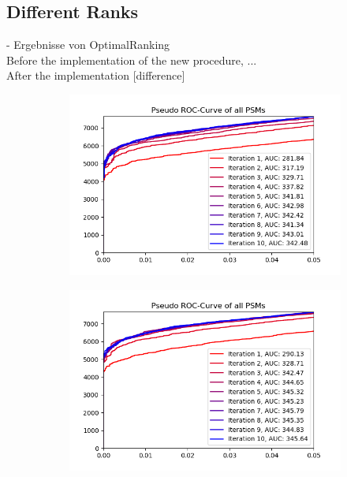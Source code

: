 \subsection{Different Ranks}
- Ergebnisse von OptimalRanking\\
Before the implementation of the new procedure, ...\\
After the implementation [difference]
\renewcommand{\baselinestretch}{0.9}
\begin{figure}
	\normalsize
	\centering
	\begin{subfigure}{0.45\textwidth}
	\includegraphics[width = \textwidth]{figures/allRanks.png}
	\caption[Result of dropping lower ranks at the end]{}
	\label{fig:all_ranks}
	\end{subfigure}
	\hfill
	\begin{subfigure}{0.45\textwidth}
	\includegraphics[width = \textwidth]{figures/onlyFirstRank.png}
	\caption[Result of dropping lower ranks at the start]{}
	\label{fig:only_rank_one}
	\end{subfigure}
\end{figure}
\renewcommand{\baselinestretch}{1}

